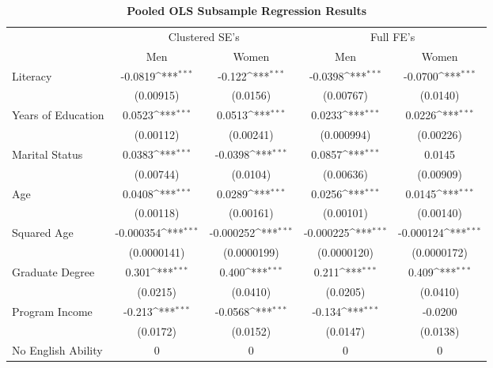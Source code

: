 \begin{table}[htbp]\centering
\def\sym#1{\ifmmode^{#1}\else\(^{#1}\)\fi}
\caption{\textbf{Pooled OLS Subsample Regression Results}}
\begin{tabular}{l*{4}{c}}
\hline\hline
                &\multicolumn{2}{c}{Clustered SE's}   &\multicolumn{2}{c}{Full FE's}        \\
                &\multicolumn{1}{c}{Men}&\multicolumn{1}{c}{Women}&\multicolumn{1}{c}{Men}&\multicolumn{1}{c}{Women}\\
\hline
Literacy        &  -0.0819\sym{***}&   -0.122\sym{***}&  -0.0398\sym{***}&  -0.0700\sym{***}\\
                &(0.00915)         & (0.0156)         &(0.00767)         & (0.0140)         \\
[1em]
Years of Education&   0.0523\sym{***}&   0.0513\sym{***}&   0.0233\sym{***}&   0.0226\sym{***}\\
                &(0.00112)         &(0.00241)         &(0.000994)         &(0.00226)         \\
[1em]
Marital Status  &   0.0383\sym{***}&  -0.0398\sym{***}&   0.0857\sym{***}&   0.0145         \\
                &(0.00744)         & (0.0104)         &(0.00636)         &(0.00909)         \\
[1em]
Age             &   0.0408\sym{***}&   0.0289\sym{***}&   0.0256\sym{***}&   0.0145\sym{***}\\
                &(0.00118)         &(0.00161)         &(0.00101)         &(0.00140)         \\
[1em]
Squared Age     &-0.000354\sym{***}&-0.000252\sym{***}&-0.000225\sym{***}&-0.000124\sym{***}\\
                &(0.0000141)         &(0.0000199)         &(0.0000120)         &(0.0000172)         \\
[1em]
Graduate Degree &    0.301\sym{***}&    0.400\sym{***}&    0.211\sym{***}&    0.409\sym{***}\\
                & (0.0215)         & (0.0410)         & (0.0205)         & (0.0410)         \\
[1em]
Program Income  &   -0.213\sym{***}&  -0.0568\sym{***}&   -0.134\sym{***}&  -0.0200         \\
                & (0.0172)         & (0.0152)         & (0.0147)         & (0.0138)         \\
[1em]
No English Ability&        0         &        0         &        0         &        0         \\

\end{tabular}
\end{table}

